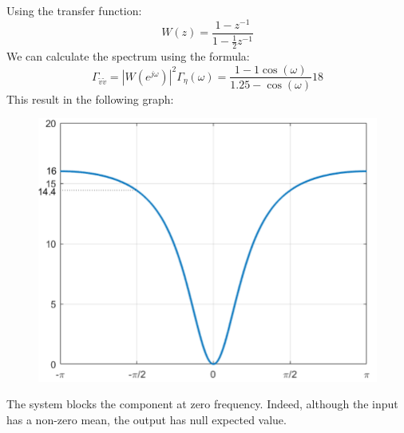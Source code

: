 Using the transfer function: 
\[W(z)=\dfrac{1-z^{-1}}{1-\frac{1}{2}z^{-1}}\]
We can calculate the spectrum using the formula:
\[\Gamma_{\tilde{v}\tilde{v}}=\left\lvert W(e^{j\omega})\right\rvert^2\Gamma_\eta(\omega)=\frac{1-1\cos(\omega)}{1.25-\cos(\omega)}18 \]
This result in the following graph:
\begin{figure}[H]
    \centering
    \includegraphics[width=0.5\linewidth]{images/22spec.png}
\end{figure}
The system blocks the component at zero frequency. 
Indeed, although the input has a non-zero mean, the output has null expected value.